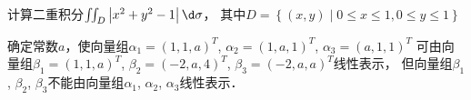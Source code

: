 \documentclass[plain,noanswer,medmath]{../../template/jnuexam}
\begin{document}
\begin{problem}[points=9]
计算二重积分$\iint_D \left| x^2 + y^2 - 1 \right| \d\sigma$，
其中$D = \left\{(x,y)\middle| 0 \le x \le 1,0 \le y \le 1 \right\}$
\end{problem}


\begin{problem}[points=9]
确定常数$a$，使向量组$\alpha_1 = (1,1,a)^T$, $\alpha_2 = (1,a,1)^T$, $\alpha_3 = (a,1,1)^T$
可由向量组$\beta_1 = (1,1,a)^T$, $\beta_2 = (- 2,a,4)^T$, $\beta_3 = (- 2,a,a)^T$线性表示，
但向量组$\beta_1$, $\beta_2$, $\beta_3$不能由向量组$\alpha_1$, $\alpha_2$, $\alpha_3$线性表示．
\end{problem}


\end{document}
